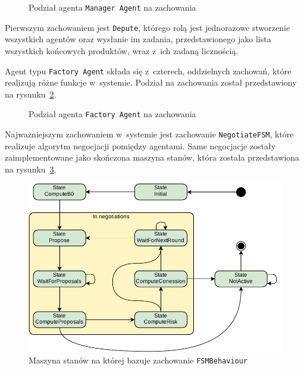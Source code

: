 \begin{figure}[h]
    \centering
    \caption{Podział agenta \texttt{Manager Agent} na zachowania}
    \label{fig:manager-behaviours}
\end{figure}

Pierwszym zachowaniem jest \texttt{Depute}, którego rolą jest jednorazowe stworzenie wszystkich agentów oraz wysłanie im zadania, przedstawionego jako lista wszystkich końcowych produktów, wraz z~ich zadaną licznością.


Agent typu \texttt{Factory Agent} składa się z~czterech, oddzielnych zachowań, które realizują różne funkcje w~systemie. Podział na zachowania został przedstawiony na rysunku~\ref{fig:factory-behaviours}.

\begin{figure}[h]
    \centering
    \caption{Podział agenta \texttt{Factory Agent} na zachowania}
    \label{fig:factory-behaviours}
\end{figure}


Najważniejszym zachowaniem w~systemie jest zachowanie \texttt{NegotiateFSM}, które realizuje algorytm negocjacji pomiędzy agentami. Same negocjacje zostały zaimplementowane jako skończona maszyna stanów, która została przedstawiona na rysunku~\ref{fig:factory-fsm}.

\begin{figure}[h]
    \centering
    \includegraphics[width=\columnwidth]{figures/SAG-FactoryFSM.pdf}
    \caption{Maszyna stanów na której bazuje zachowanie \texttt{FSMBehaviour}}
    \label{fig:factory-fsm}
\end{figure}

